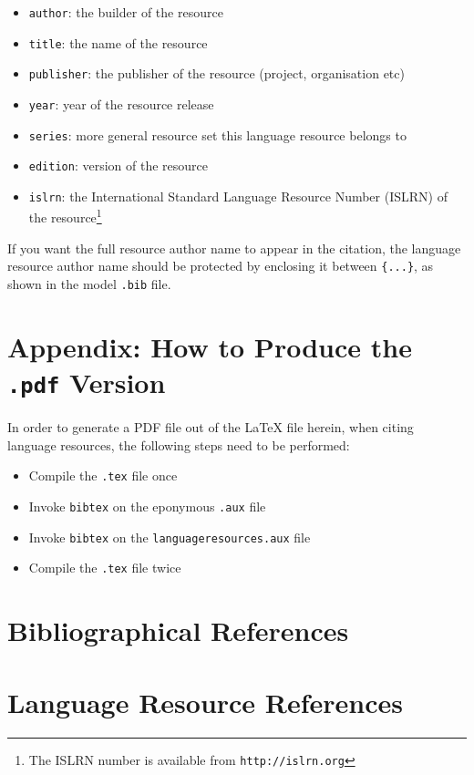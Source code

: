 \documentclass[10pt, a4paper]{article}
\begin{document}
\begin{itemize}
    \item{\texttt{author}: the builder of the resource}
    \item{\texttt{title}: the name of the resource}
    \item{\texttt{publisher}: the publisher of the resource (project,
          organisation etc)}
    \item{\texttt{year}: year of the resource release}
    \item{\texttt{series}: more general resource set this language resource
          belongs to}
    \item{\texttt{edition}: version of the resource}
    \item{\texttt{islrn}: the International Standard Language Resource Number
          (ISLRN) of the resource\footnote{The ISLRN number is available from
          \texttt{http://islrn.org}}} 
\end{itemize}

If you want the full resource author name to appear in the citation, the
language resource author name should be protected by enclosing it between
\texttt{\{...\}}, as shown in the model \texttt{.bib} file.

\vspace{.3\baselineskip}

\section*{Appendix: How to Produce the \texttt{.pdf} Version}

In order to generate a PDF file out of the LaTeX file herein, when citing
language resources, the following steps need to be performed:

\begin{itemize}
    \item{Compile the \texttt{.tex} file once}
    \item{Invoke \texttt{bibtex} on the eponymous \texttt{.aux} file}
    \item{Invoke \texttt{bibtex} on the \texttt{languageresources.aux} file}
    \item{Compile the \texttt{.tex} file twice}
\end{itemize}

\section{Bibliographical References}
\label{main:ref}





\section{Language Resource References}
\label{lr:ref}
\end{document}

